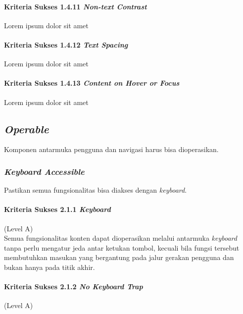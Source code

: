 \paragraph{Kriteria Sukses 1.4.11 \textit{Non-text Contrast}}
\label{sec:kriteria_sukses_1.4.11}
Lorem ipsum dolor sit amet

\paragraph{Kriteria Sukses 1.4.12 \textit{Text Spacing}}
\label{sec:kriteria_sukses_1.4.12}
Lorem ipsum dolor sit amet

\paragraph{Kriteria Sukses 1.4.13 \textit{Content on Hover or Focus}}
\label{sec:kriteria_sukses_1.4.13}
Lorem ipsum dolor sit amet


\subsection{\textit{Operable}}
\label{sec:operable}
Komponen antarmuka pengguna dan navigasi harus bisa dioperasikan.

\subsubsection{\textit{Keyboard Accessible}}
\label{sec:keyboard_accessible}
Pastikan semua fungsionalitas bisa diakses dengan \textit{keyboard}.

\paragraph{Kriteria Sukses 2.1.1 \textit{Keyboard}}
\label{sec:kriteria_sukses_2.1.1}
(Level A)\\

Semua fungsionalitas konten dapat dioperasikan melalui antarmuka \textit{keyboard} tanpa perlu mengatur jeda antar ketukan tombol, kecuali bila fungsi tersebut membutuhkan masukan yang bergantung pada jalur gerakan pengguna dan bukan hanya pada titik akhir.

\paragraph{Kriteria Sukses 2.1.2 \textit{No Keyboard Trap}}
\label{sec:kriteria_sukses_2.1.2}
(Level A)\\

